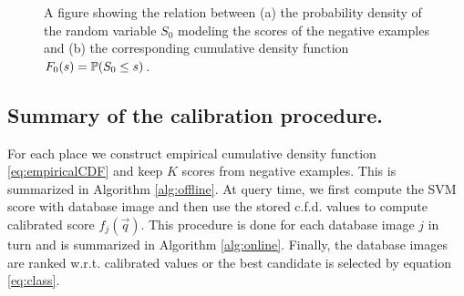       \begin{figure}[t]
         \vspace*{-3mm}
         \caption{A figure showing the relation between (a) the probability density of the random variable $S_0$ modeling the scores of the negative examples and (b) the corresponding cumulative density function $F_0(s)=\mathbb{P}(S_0 \leq s)$.
         }
               \vspace*{-3mm}
         \label{fig:qntExample}
      \end{figure}
   \subsection{Summary of the calibration procedure.}
    For each place we construct empirical cumulative density function \eqref{eq:empiricalCDF} and keep $K$ scores from negative examples. This is summarized in Algorithm \ref{alg:offline}. At query time, we first compute the SVM score with database image and then use the stored c.f.d. values to compute calibrated score $f_j(\vec{q})$. This procedure is done for each database image $j$ in turn and is summarized in Algorithm \ref{alg:online}. Finally, the database images are ranked w.r.t. calibrated values or the best candidate is selected by equation \eqref{eq:class}. 


